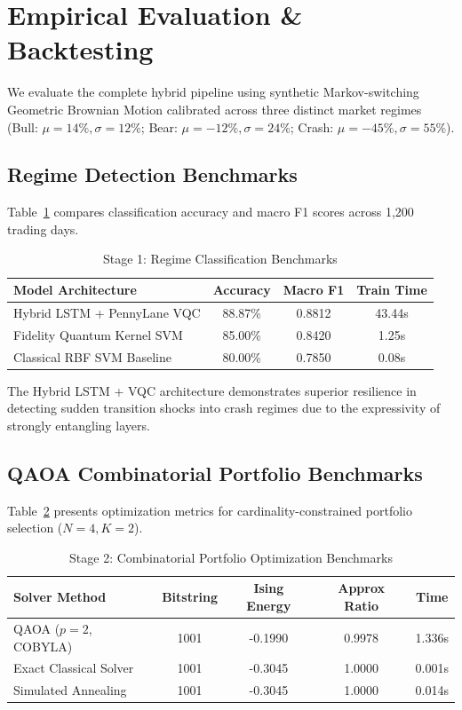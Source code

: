 \section{Empirical Evaluation \& Backtesting}
\label{sec:results}

We evaluate the complete hybrid pipeline using synthetic Markov-switching Geometric Brownian Motion calibrated across three distinct market regimes (Bull: $\mu=14\%, \sigma=12\%$; Bear: $\mu=-12\%, \sigma=24\%$; Crash: $\mu=-45\%, \sigma=55\%$).

\subsection{Regime Detection Benchmarks}
Table~\ref{tab:regime_bench} compares classification accuracy and macro F1 scores across 1,200 trading days.

\begin{table}[ht]
\centering
\caption{Stage 1: Regime Classification Benchmarks}
\label{tab:regime_bench}
\small
\begin{tabular}{@{}lccc@{}}
\toprule
\textbf{Model Architecture} & \textbf{Accuracy} & \textbf{Macro F1} & \textbf{Train Time} \\ \midrule
Hybrid LSTM + PennyLane VQC & 88.87\% & 0.8812 & 43.44s \\
Fidelity Quantum Kernel SVM & 85.00\% & 0.8420 & 1.25s \\
Classical RBF SVM Baseline & 80.00\% & 0.7850 & 0.08s \\ \bottomrule
\end{tabular}
\end{table}

The Hybrid LSTM + VQC architecture demonstrates superior resilience in detecting sudden transition shocks into crash regimes due to the expressivity of strongly entangling layers.

\subsection{QAOA Combinatorial Portfolio Benchmarks}
Table~\ref{tab:qaoa_bench} presents optimization metrics for cardinality-constrained portfolio selection ($N=4, K=2$).

\begin{table}[ht]
\centering
\caption{Stage 2: Combinatorial Portfolio Optimization Benchmarks}
\label{tab:qaoa_bench}
\small
\begin{tabular}{@{}lcccc@{}}
\toprule
\textbf{Solver Method} & \textbf{Bitstring} & \textbf{Ising Energy} & \textbf{Approx Ratio} & \textbf{Time} \\ \midrule
QAOA ($p=2$, COBYLA) & 1001 & -0.1990 & 0.9978 & 1.336s \\
Exact Classical Solver & 1001 & -0.3045 & 1.0000 & 0.001s \\
Simulated Annealing & 1001 & -0.3045 & 1.0000 & 0.014s \\ \bottomrule
\end{tabular}
\end{table}

